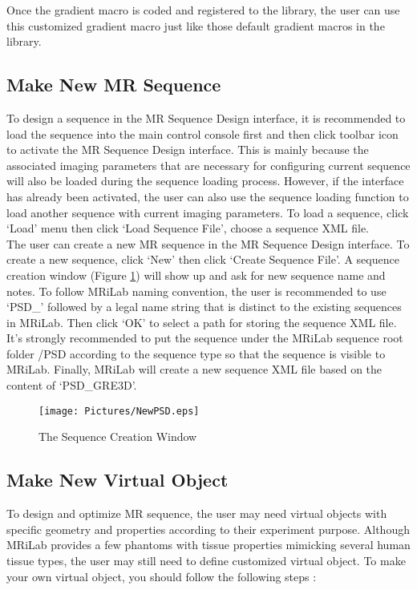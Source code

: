 \documentclass{book}%
\begin{document}
Once the gradient macro is coded and registered to the library, the user can use this customized gradient macro just like those default gradient macros in the library.

\subsection{Make New MR Sequence}

To design a sequence in the MR Sequence Design interface, it is recommended to load the sequence into the main control console first and then click toolbar icon to activate the MR Sequence Design interface. This is mainly because the associated imaging parameters that are necessary for configuring current sequence will also be loaded during the sequence loading process. However, if the interface has already been activated, the user can also use the sequence loading function to load another sequence with current imaging parameters. To load a sequence, click `Load' menu then click `Load Sequence File', choose a sequence XML file.\\

The user can create a new MR sequence in the MR Sequence Design interface. To create a new sequence, click `New' then click `Create Sequence File'. A sequence creation window (Figure \ref{fig:NewPSD}) will show up and ask for new sequence name and notes. To follow MRiLab naming convention, the user is recommended to use `PSD\_' followed by a legal name string that is distinct to the existing sequences in MRiLab. Then click `OK' to select a path for storing the sequence XML file. It's strongly recommended to put the sequence under the MRiLab sequence root folder /PSD according to the sequence type so that the sequence is visible to MRiLab. Finally, MRiLab will create a new sequence XML file based on the content of `PSD\_GRE3D'.

\begin{figure}[htbp]
	\centering
		\texttt{[image: Pictures/NewPSD.eps]}
	\caption{The Sequence Creation Window}
	\label{fig:NewPSD}
\end{figure}


\subsection{Make New Virtual Object}

To design and optimize MR sequence, the user may need virtual objects with specific geometry and properties according to their experiment purpose. Although MRiLab provides a few phantoms with tissue properties mimicking several human tissue types, the user may still need to define customized virtual object. To make your own virtual object, you should follow the following steps :
\end{document}
